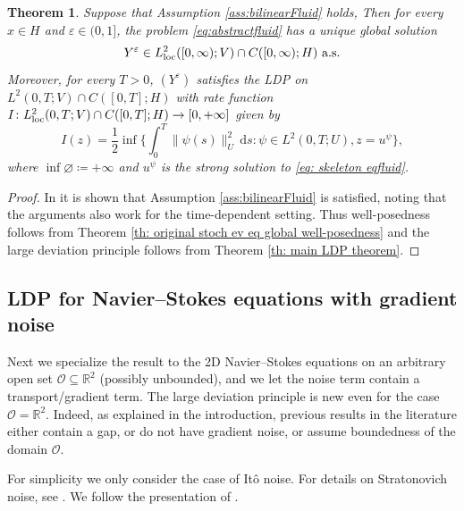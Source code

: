 \documentclass{amsart}
\newcommand{\Dom}{\mathcal{O}}
\newcommand{\dd}{\,\mathrm{d}}
\newcommand{\<}{\langle}
\newcommand{\?}{\rangle}
\theoremstyle{plain}
\newtheorem{theorem}{Theorem}[section]
\theoremstyle{remark}
\theoremstyle{plain}
\numberwithin{equation}{section}
\def\R{{\mathbb R}}
\newcommand{\eps}{\varepsilon}
\begin{document}
\begin{theorem}\label{thm:fluidabstract}
Suppose that Assumption \ref{ass:bilinearFluid} holds,
Then for every $x\in H$ and $\varepsilon\in (0,1]$, the problem \eqref{eq:abstractfluid} has a unique global solution 
\[
Y^{\varepsilon} \in L^2_{\rm loc}([0,\infty);V)\cap C([0,\infty);H) \ \text{a.s.}
\]
Moreover, for every $T>0$, $(Y^\eps)$ satisfies the LDP on $L^2(0,T;V)\cap C([0,T];H)$ with rate function $I\colon L^2_{\rm loc}(0,T;V)\cap C([0,T];H)\to [0,+\infty]$ given by
\[
I(z)=\frac{1}{2}\inf\Big\{\int_0^T\|\psi(s)\|_U^2\dd s : \psi\in L^2(0,T;U), z=u^{\psi}\Big\},
\]
where $\inf\varnothing\coloneqq +\infty$ and $u^\psi$ is the strong solution to \eqref{eq: skeleton eqfluid}.
\end{theorem} 
\begin{proof}
  In \cite[Th. 7.10]{AVsurvey} it is shown that Assumption \ref{ass:bilinearFluid} is satisfied, noting that the arguments also work for the time-dependent setting. Thus well-posedness follows from Theorem \ref{th: original stoch ev eq global well-posedness} and the large deviation principle follows from Theorem \ref{th: main LDP theorem}. 
\end{proof}  

\subsection{LDP for Navier--Stokes equations with gradient noise}\label{ss:NS}
Next we specialize the result to the 2D Navier--Stokes equations  on an arbitrary open set $\Dom\subseteq \R^2$ (possibly unbounded), and we let the noise term contain a transport/gradient term. The large deviation principle is new even for the case $\Dom = \R^2$. Indeed, as explained in the introduction, previous results in the literature either contain a gap, or do not have gradient noise, or assume boundedness of the domain $\Dom$.  
 
For simplicity we only consider the case of It\^o noise. For details on Stratonovich noise, see \cite[App. A]{AV24SNS}. We follow the presentation of \cite[\S 7.3.4]{AVsurvey}.  
\end{document}
